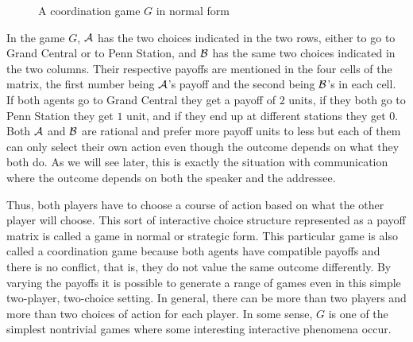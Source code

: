 \begin{figure}
\caption{A coordination game $G$ in normal form} \label{fig:coordination game G in normal form}
\end{figure}

In the game $G$, $\cal A$ has the two choices indicated in the two rows, either to go to Grand Central or to Penn Station, and $\cal B$ has the same two choices indicated in the two columns. Their respective payoffs are mentioned in the four cells of the matrix, the first number being $\cal A$'s payoff and the second being $\cal B$'s in each cell. If both agents go to Grand Central they get a payoff of $2$ units, if they both go to Penn Station they get $1$ unit, and if they end up at different stations they get $0$. Both $\cal A$ and $\cal B$ are rational and prefer more payoff units to less but each of them can only select their own action even though the outcome depends on what they both do. As we will see later, this is exactly the situation with communication where the outcome depends on both the speaker and the addressee. 


Thus, both players have to choose a course of action based on what the other player will choose. This sort of interactive choice structure represented as a payoff matrix is called a game in normal or strategic form. This particular game is also called a coordination game because both agents have compatible payoffs and there is no conflict, that is, they do not value the same outcome differently. By varying the payoffs it is possible to generate a range of games even in this simple two-player, two-choice setting. In general, there can be more than two players and more than two choices of action for each player. In some sense, $G$ is one of the simplest nontrivial games where some interesting interactive phenomena occur.

